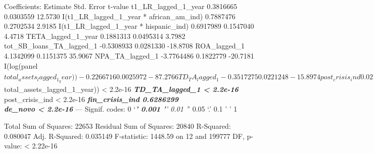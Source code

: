 \documentclass[]{article}
\begin{document}
Coefficients: Estimate Std. Error t-value t1\_LR\_lagged\_1\_year
0.3816665 0.0303559 12.5730 I(t1\_LR\_lagged\_1\_year *
african\_am\_ind) 0.7887476 0.2702534 2.9185 I(t1\_LR\_lagged\_1\_year *
hispanic\_ind) 0.6917989 0.1547040 4.4718 TETA\_lagged\_1\_year
0.1881313 0.0495314 3.7982 tot\_SB\_loans\_TA\_lagged\_1 -0.5308933
0.0281330 -18.8708 ROA\_lagged\_1 4.1342099 0.1151375 35.9067
NPA\_TA\_lagged\_1 -3.7764486 0.1822779 -20.7181
I(log(panel\(total_assets_lagged_1_year)) -0.2266716 0.0025972 -87.2766 TD_TA_lagged_1 -0.3517275 0.0221248 -15.8974 post_crisis_ind 0.0214673 0.0017485 12.2773 fin_crisis_ind -0.0010580 0.0021875 -0.4837 de_novo 0.2187735 0.0050212 43.5700  Pr(>|t|) t1_LR_lagged_1_year < 2.2e-16 *** I(t1_LR_lagged_1_year * african_am_ind) 0.0035170 ** I(t1_LR_lagged_1_year * hispanic_ind) 7.762e-06 *** TETA_lagged_1_year 0.0001458 *** tot_SB_loans_TA_lagged_1 < 2.2e-16 *** ROA_lagged_1 < 2.2e-16 *** NPA_TA_lagged_1 < 2.2e-16 *** I(log(panel\)total\_assets\_lagged\_1\_year))
\textless{} 2.2e-16 \textbf{\emph{ TD\_TA\_lagged\_1 \textless{} 2.2e-16
}} post\_crisis\_ind \textless{} 2.2e-16 \textbf{\emph{ fin\_crisis\_ind
0.6286299\\
de\_novo \textless{} 2.2e-16 }} --- Signif. codes: 0 `\emph{\textbf{'
0.001 '}' 0.01 '}' 0.05 `.' 0.1 ' ' 1

Total Sum of Squares: 22653 Residual Sum of Squares: 20840 R-Squared:
0.080047 Adj. R-Squared: 0.035149 F-statistic: 1448.59 on 12 and 199777
DF, p-value: \textless{} 2.22e-16
\end{document}
